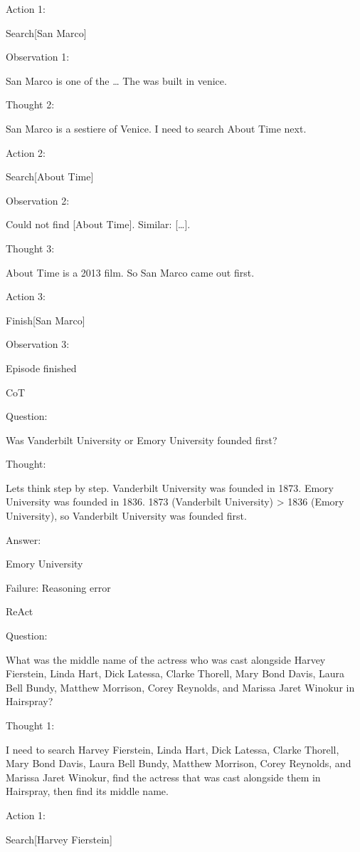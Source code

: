 \documentclass[
]{article}
\begin{document}
Action 1:

Search{[}San Marco{]}

Observation 1:

San Marco is one of the \ldots{} The was built in venice.

Thought 2:

San Marco is a sestiere of Venice. I need to search About Time next.

Action 2:

Search{[}About Time{]}

Observation 2:

Could not find {[}About Time{]}. Similar: {[}\ldots{]}.

Thought 3:

About Time is a 2013 film. So San Marco came out first.

Action 3:

Finish{[}San Marco{]}

Observation 3:

Episode finished

CoT

Question:

Was Vanderbilt University or Emory University founded first?

Thought:

Let\textquotesingle s think step by step. Vanderbilt University was
founded in 1873. Emory University was founded in 1836. 1873 (Vanderbilt
University) \textgreater{} 1836 (Emory University), so Vanderbilt
University was founded first.

Answer:

Emory University

Failure: Reasoning error

ReAct

Question:

What was the middle name of the actress who was cast alongside Harvey
Fierstein, Linda Hart, Dick Latessa, Clarke Thorell, Mary Bond Davis,
Laura Bell Bundy, Matthew Morrison, Corey Reynolds, and Marissa Jaret
Winokur in Hairspray?

Thought 1:

I need to search Harvey Fierstein, Linda Hart, Dick Latessa, Clarke
Thorell, Mary Bond Davis, Laura Bell Bundy, Matthew Morrison, Corey
Reynolds, and Marissa Jaret Winokur, find the actress that was cast
alongside them in Hairspray, then find its middle name.

Action 1:

Search{[}Harvey Fierstein{]}
\end{document}
